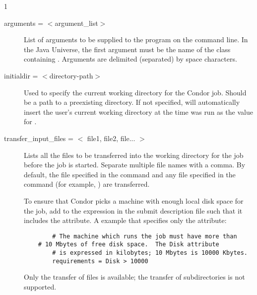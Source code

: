 \begin{ManPage}{\label{man-condor-submit}}{1}
\begin{description}

\item[arguments = $<$argument\_list$>$]
List of arguments to be supplied
to the program on the command line.   In the Java Universe, the first
argument must be the name of the class containing .
Arguments are delimited (separated) by space characters.


\item[initialdir = $<$directory-path$>$] 
Used to specify the current
working directory for the Condor job. Should be a path to a preexisting
directory. If not specified,  will automatically insert
the user's current working directory at the time  was run
as the value for . 


\item[transfer\_input\_files = $<$ file1, file2, file... $>$] 
Lists all the files to be transferred into the 
working directory for the job before the job is started.
Separate multiple file names with a comma.
By default, the file specified in the
 command and any file specified in the 
command (for example, ) are transferred.

To ensure
that Condor picks a machine with enough local disk space for the job,
add to the 
expression in the submit description file such that it includes
the  attribute.
A  example that specifies only the  attribute:
\begin{verbatim}
        # The machine which runs the job must have more than
	# 10 Mbytes of free disk space.  The Disk attribute
        # is expressed in kilobytes; 10 Mbytes is 10000 Kbytes.
        requirements = Disk > 10000
\end{verbatim}

Only the transfer of files is available; the transfer of
subdirectories is not supported.



\end{description}
\end{ManPage}
